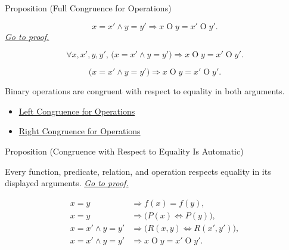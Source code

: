 \begin{propositionbox}{Proposition (Full Congruence for Operations)}
\begin{proposition}
\label{prop:substitution-preserves-operations-full}
\[
x=x' \land y=y' \Longrightarrow x\mathbin{O}y=x'\mathbin{O}y'.
\]
\hyperref[prf:substitution-preserves-operations-full]{\textit{Go to proof.}}
\end{proposition}
\end{propositionbox}

\begin{remark*}
\[
\forall x,x',y,y',\,
\bigl(x=x'\land y=y'\bigr)
\Longrightarrow
x\mathbin{O}y=x'\mathbin{O}y'.
\]
\end{remark*}

\begin{remark*}
\[
\bigl(x=x'\land y=y'\bigr)
\Longrightarrow x\mathbin{O}y=x'\mathbin{O}y'.
\]
\end{remark*}

\begin{remark*}[Interpretation]
Binary operations are congruent with respect to equality in both arguments.
\end{remark*}

\begin{dependencies}
\begin{itemize}
  \item \hyperref[prop:substitution-preserves-operations-left]{Left Congruence for Operations}
  \item \hyperref[prop:substitution-preserves-operations-right]{Right Congruence for Operations}
\end{itemize}
\end{dependencies}

\begin{propositionbox}{Proposition (Congruence with Respect to Equality Is Automatic)}
\begin{proposition}
\label{prop:congruence-with-respect-to-equality-is-automatic}
Every function, predicate, relation, and operation respects equality in its
displayed arguments.
\hyperref[prf:congruence-with-respect-to-equality-is-automatic]{\textit{Go to proof.}}
\end{proposition}
\end{propositionbox}

\begin{remark*}
\[
\begin{aligned}
x=y&\Longrightarrow f(x)=f(y),\\
x=y&\Longrightarrow \bigl(P(x)\Longleftrightarrow P(y)\bigr),\\
x=x'\land y=y'
&\Longrightarrow \bigl(R(x,y)\Longleftrightarrow R(x',y')\bigr),\\
x=x'\land y=y'
&\Longrightarrow x\mathbin{O}y=x'\mathbin{O}y'.
\end{aligned}
\]
\end{remark*}

